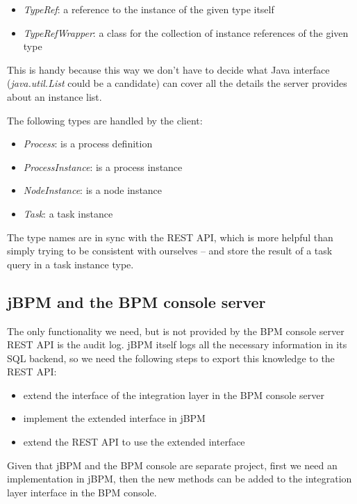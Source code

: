 \begin{itemize}
\item \emph{TypeRef}: a reference to the instance of the given type itself
\item \emph{TypeRefWrapper}: a class for the collection of instance references of the given type
\end{itemize}

This is handy because this way we don't have to decide what Java interface
(\emph{java.util.List} could be a candidate) can cover all the details the
server provides about an instance list.

The following types are handled by the client:

\begin{itemize}
\item \emph{Process}: is a process definition
\item \emph{ProcessInstance}: is a process instance
\item \emph{NodeInstance}: is a node instance
\item \emph{Task}: a task instance
\end{itemize}

The type names are in sync with the REST API, which is more helpful than simply
trying to be consistent with ourselves -- and store the result of a task query
in a task instance type.

\subsection{jBPM and the BPM console server}

The only functionality we need, but is not provided by the BPM console server
REST API is the audit log. jBPM itself logs all the necessary information in
its SQL backend, so we need the following steps to export this knowledge to the
REST API:

\begin{itemize}
\item extend the interface of the integration layer in the BPM console server
\item implement the extended interface in jBPM
\item extend the REST API to use the extended interface
\end{itemize}

Given that jBPM and the BPM console are separate project, first we need an
implementation in jBPM, then the new methods can be added to the integration
layer interface in the BPM console.

